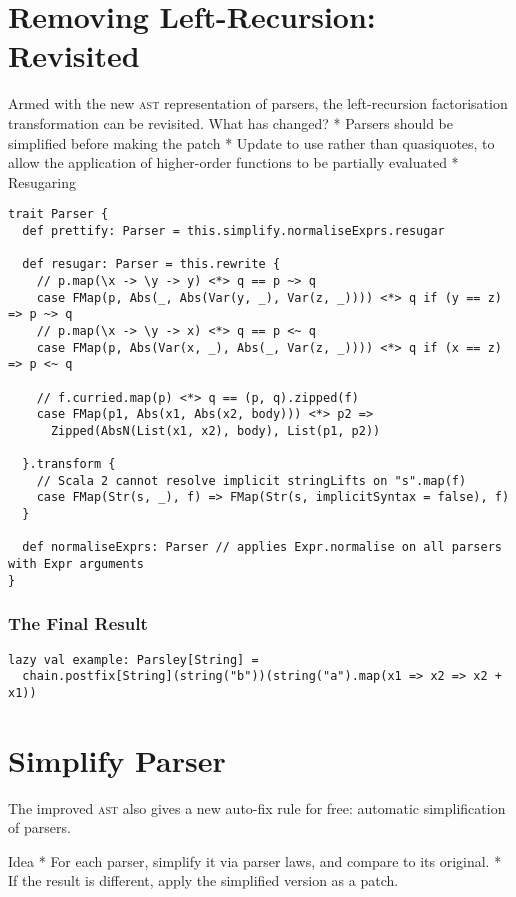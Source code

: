 \documentclass[../../main.tex]{subfiles}
\begin{document}

\section{Removing Left-Recursion: Revisited}
Armed with the new \textsc{ast} representation of parsers, the left-recursion factorisation transformation can be revisited.
What has changed?
* Parsers should be simplified before making the patch
* Update to use  rather than quasiquotes, to allow the application of higher-order functions to be partially evaluated
* Resugaring

\begin{verbatim}
trait Parser {
  def prettify: Parser = this.simplify.normaliseExprs.resugar

  def resugar: Parser = this.rewrite {
    // p.map(\x -> \y -> y) <*> q == p ~> q
    case FMap(p, Abs(_, Abs(Var(y, _), Var(z, _)))) <*> q if (y == z) => p ~> q
    // p.map(\x -> \y -> x) <*> q == p <~ q
    case FMap(p, Abs(Var(x, _), Abs(_, Var(z, _)))) <*> q if (x == z) => p <~ q

    // f.curried.map(p) <*> q == (p, q).zipped(f)
    case FMap(p1, Abs(x1, Abs(x2, body))) <*> p2 =>
      Zipped(AbsN(List(x1, x2), body), List(p1, p2))

  }.transform {
    // Scala 2 cannot resolve implicit stringLifts on "s".map(f)
    case FMap(Str(s, _), f) => FMap(Str(s, implicitSyntax = false), f)
  }

  def normaliseExprs: Parser // applies Expr.normalise on all parsers with Expr arguments
}
\end{verbatim}

\subsubsection{The Final Result}
\begin{verbatim}
lazy val example: Parsley[String] =
  chain.postfix[String](string("b"))(string("a").map(x1 => x2 => x2 + x1))
\end{verbatim}

\section{Simplify Parser}
The improved  \textsc{ast} also gives a new auto-fix rule for free: automatic simplification of parsers.

Idea
* For each parser, simplify it via parser laws, and compare to its original.
* If the result is different, apply the simplified version as a patch.
\end{document}
